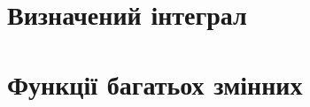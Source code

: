 \documentclass[a4paper, 12pt, oneside]{extreport}
\begin{document}









\chapter{Визначений інтеграл}






\setcounter{subsection}{9}



\chapter{Функції багатьох змінних}
\setcounter{subsection}{2}


\setcounter{subsection}{9}


\end{document}
